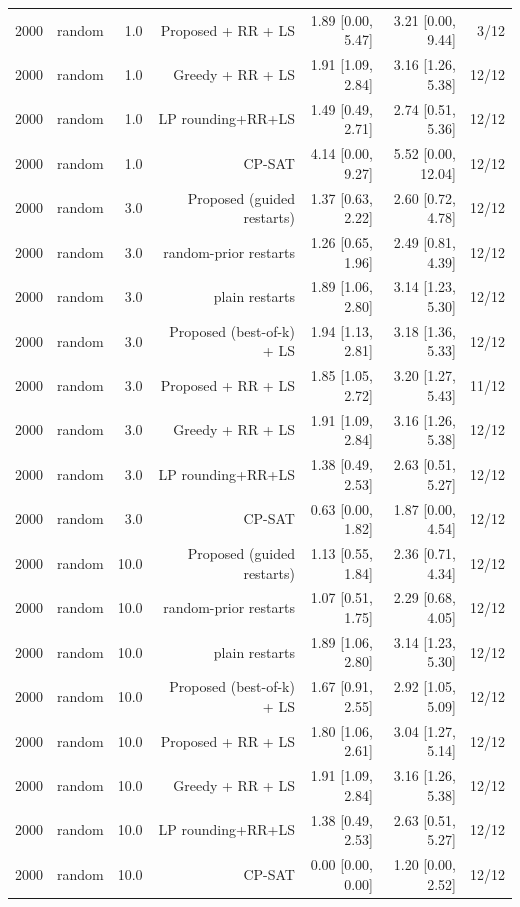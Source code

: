 \begin{table}[t]
\begin{tabular}{llrrrrr}
2000 & random & 1.0 & Proposed + RR + LS & 1.89 [0.00, 5.47] & 3.21 [0.00, 9.44] & 3/12 \\
2000 & random & 1.0 & Greedy + RR + LS & 1.91 [1.09, 2.84] & 3.16 [1.26, 5.38] & 12/12 \\
2000 & random & 1.0 & LP rounding+RR+LS & 1.49 [0.49, 2.71] & 2.74 [0.51, 5.36] & 12/12 \\
2000 & random & 1.0 & CP-SAT & 4.14 [0.00, 9.27] & 5.52 [0.00, 12.04] & 12/12 \\
2000 & random & 3.0 & Proposed (guided restarts) & 1.37 [0.63, 2.22] & 2.60 [0.72, 4.78] & 12/12 \\
2000 & random & 3.0 & random-prior restarts & 1.26 [0.65, 1.96] & 2.49 [0.81, 4.39] & 12/12 \\
2000 & random & 3.0 & plain restarts & 1.89 [1.06, 2.80] & 3.14 [1.23, 5.30] & 12/12 \\
2000 & random & 3.0 & Proposed (best-of-k) + LS & 1.94 [1.13, 2.81] & 3.18 [1.36, 5.33] & 12/12 \\
2000 & random & 3.0 & Proposed + RR + LS & 1.85 [1.05, 2.72] & 3.20 [1.27, 5.43] & 11/12 \\
2000 & random & 3.0 & Greedy + RR + LS & 1.91 [1.09, 2.84] & 3.16 [1.26, 5.38] & 12/12 \\
2000 & random & 3.0 & LP rounding+RR+LS & 1.38 [0.49, 2.53] & 2.63 [0.51, 5.27] & 12/12 \\
2000 & random & 3.0 & CP-SAT & 0.63 [0.00, 1.82] & 1.87 [0.00, 4.54] & 12/12 \\
2000 & random & 10.0 & Proposed (guided restarts) & 1.13 [0.55, 1.84] & 2.36 [0.71, 4.34] & 12/12 \\
2000 & random & 10.0 & random-prior restarts & 1.07 [0.51, 1.75] & 2.29 [0.68, 4.05] & 12/12 \\
2000 & random & 10.0 & plain restarts & 1.89 [1.06, 2.80] & 3.14 [1.23, 5.30] & 12/12 \\
2000 & random & 10.0 & Proposed (best-of-k) + LS & 1.67 [0.91, 2.55] & 2.92 [1.05, 5.09] & 12/12 \\
2000 & random & 10.0 & Proposed + RR + LS & 1.80 [1.06, 2.61] & 3.04 [1.27, 5.14] & 12/12 \\
2000 & random & 10.0 & Greedy + RR + LS & 1.91 [1.09, 2.84] & 3.16 [1.26, 5.38] & 12/12 \\
2000 & random & 10.0 & LP rounding+RR+LS & 1.38 [0.49, 2.53] & 2.63 [0.51, 5.27] & 12/12 \\
2000 & random & 10.0 & CP-SAT & 0.00 [0.00, 0.00] & 1.20 [0.00, 2.52] & 12/12 \\

\end{tabular}
\end{table}
